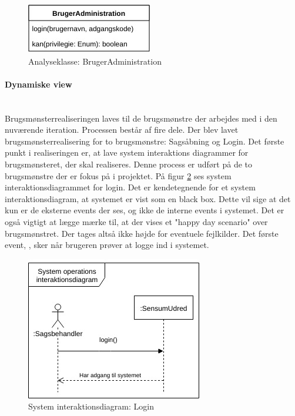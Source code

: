 \documentclass[../../main.tex]{subfiles}
\begin{document}
\begin{figure}[H]
  \centering
  \includegraphics[scale=.5]{figurer/BA.jpg}
  \caption{Analyseklasse: BrugerAdministration}
  \label{fig:analyseklasse}
\end{figure}

\paragraph{Dynamiske view} \mbox{} \\
Brugsmønsterrealiseringen laves til de brugsmønstre der arbejdes med i den nuværende iteration. Processen består af fire dele. Der blev lavet brugsmønsterrealisering for to brugsmønstre: Sagsåbning og Login. Det første punkt i realiseringen er, at lave system interaktions diagrammer for brugsmønsteret, der skal realiseres. Denne process er udført på de to brugsmønstre der er fokus på i projektet. På figur \ref{fig:si:login} ses system interaktionsdiagrammet for login. Det er kendetegnende for et system interaktionsdiagram, at systemet er vist som en black box. Dette vil sige at det kun er de eksterne events der ses, og ikke de interne events i systemet. Det er også vigtigt at lægge mærke til, at der vises et "happy day scenario" over brugsmønstret. Der tages altså ikke højde for eventuele fejlkilder. Det første event, , sker når brugeren prøver at logge ind i systemet.   

\begin{figure}[H]
  \centering
  \includegraphics[scale=.6]{figurer/Login.jpg}
  \caption{System interaktionsdiagram: Login}
  \label{fig:si:login}
\end{figure}
\end{document}
